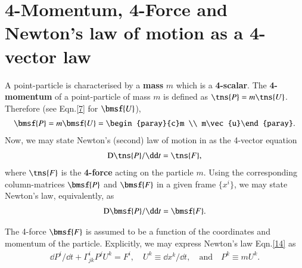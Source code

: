 \documentclass[10pt]{article}
\begin{document}
\section{4-Momentum, 4-Force and Newton's law of motion 
as a 4-vector law}
A point-particle is characterised 
by a \textbf{mass} $m$ which is a \textbf{4-scalar}.  
The \textbf{4-momentum} of a point-particle of mass  $m$ 
is defined  as $\tns{P}=m\tns{U}$. Therefore (see 
Eqn.\eqref{7} for ${\bmsf{U}}$),
\begin{align}\label{12}
{\bmsf{P}}=m{\bmsf{U}}=\begin{paray}{c}m \\ 
m\vec{u}\end{paray}.
\end{align}
Now, we may state Newton's (second) law of motion in  
as the 4-vector equation 
\begin{align}\label{13}
{{\mathrm{D}}}\tns{P}/\dd t=\tns{F},
\end{align}
where $\tns{F}$ is the \textbf{4-force} acting on 
the particle $m$. Using the  corresponding column-matrices 
$\bmsf{P}$ and 
$\bmsf{F}$ in a given frame $\{x^i\}$, we may 
state Newton's law,  equivalently, as
\begin{align}\label{14}
{\mathrm{D}}{\bmsf{P}}/\dd t={\bmsf{F}}.
\end{align}

The 4-force $\bmsf{F}$ is assumed to be
a function of the coordinates and momentum of the particle. 
Explicitly, we may express  Newton's law Eqn.\eqref{14}  as 
\begin{align}\label{15}
\dd P^i /\dd t + \Gamma^i_{jk}P^j
U^k=F^i, \quad  U^k \equiv \dd x^k/\dd  t, \quad \text{and} 
\quad P^k \equiv m U^k.
\end{align}
\end{document}
